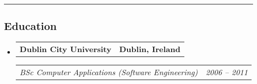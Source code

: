 \documentclass[10pt,letterpaper]{article}
\makeatletter
\newcommand{\headerrow}[2]
{\begin{tabular*}{\linewidth}{l@{\extracolsep{\fill}}r}
     #1 &
     #2 \\
\end{tabular*}}
\makeatother
\begin{document}
    \hrule
    \vspace{-1em}
    \subsection*{\Large Education}

    \begin{itemize}[leftmargin=1em]
        \parskip=0.1em

        \item
        \headerrow
        {\textbf{Dublin City University}}
        {\textbf{Dublin, Ireland}}
        \headerrow
        {\emph{BSc Computer Applications (Software Engineering)}}
        {\emph{2006 -- 2011 }}


    \end{itemize}
\end{document}
